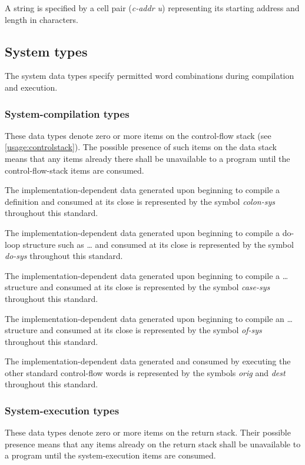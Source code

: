 A string is specified by a cell pair (\emph{c-addr u}) representing
its starting address and length in characters.

\subsection{System types} %

The system data types specify permitted word combinations during
compilation and execution.

\subsubsection{System-compilation types} %

These data types denote zero or more items on the control-flow stack
(see \ref{usage:controlstack}). The possible presence of such items
on the data stack means that any items already there shall be
unavailable to a program until the control-flow-stack items are
consumed.

The implementation-dependent data generated upon beginning to compile
a definition and consumed at its close is represented by the symbol
\emph{colon-sys} throughout this standard.

The implementation-dependent data generated upon beginning to
compile a do-loop structure such as  {\ldots} 
and consumed at its close is represented by the symbol \emph{do-sys}
throughout this standard.

The implementation-dependent data generated upon beginning to
compile a  {\ldots}  structure and consumed
at its close is represented by the symbol \emph{case-sys} throughout
this standard.

The implementation-dependent data generated upon beginning to
compile an  {\ldots}  structure and consumed
at its close is represented by the symbol \emph{of-sys} throughout
this standard.

The implementation-dependent data generated and consumed by executing
the other standard control-flow words is represented by the symbols
\emph{orig} and \emph{dest} throughout this standard.

\subsubsection{System-execution types} %

These data types denote zero or more items on the return stack.
Their possible presence means that any items already on the return
stack shall be unavailable to a program until the system-execution
items are consumed.

